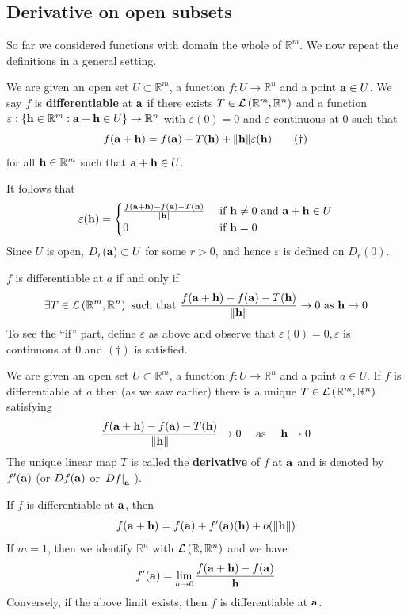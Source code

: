 \documentclass[a4paper]{article}
\begin{document}
\subsection{Derivative on open subsets}
So far we considered functions with domain the whole of $\mathbb{R}^{m}$. We now repeat the definitions in a general setting.

\begin{definition}
    We are given an open set $U \subset \mathbb{R}^{m}$, a function $f: U \rightarrow \mathbb{R}^{n}$ and a point ${\bf a} \in U$. We say $f$ is \textbf{differentiable} at ${\bf a}$ if there exists $T \in {\mathcal{L}}\left(\mathbb{R}^{m}, \mathbb{R}^{n}\right)$ and a function $\varepsilon:\left\{{\bf h} \in \mathbb{R}^{m}: {\bf a}+{\bf h} \in U\right\} \rightarrow \mathbb{R}^{n}$ with $\varepsilon(0)=0$ and $\varepsilon$ continuous at 0 such that
\[
f({\bf a}+{\bf h})=f({\bf a})+T({\bf h})+\|{\bf h}\| \varepsilon({\bf h}) \tag{$\dagger$}
\]
for all ${\bf h} \in \mathbb{R}^{m}$ such that ${\bf a}+{\bf h} \in U$.
\end{definition}
It follows that
$$
\varepsilon({\bf h})= \begin{cases}\frac{f({\bf a}+{\bf h})-f({\bf a})-T({\bf h})}{\|{\bf h}\|} & \text { if } {\bf h} \neq 0 \text { and } {\bf a}+{\bf h} \in U \\ 0 & \text { if } {\bf h}=0\end{cases}
$$
Since $U$ is open, $D_{r}({\bf a}) \subset U$ for some $r>0$, and hence $\varepsilon$ is defined on $D_{r}(0)$.
\begin{note}
    $f$ is differentiable at $a$ if and only if
$$
\exists T \in {\mathcal{L}}\left(\mathbb{R}^{m}, \mathbb{R}^{n}\right) \text { such that } \frac{f({\bf a}+{\bf h})-f({\bf a})-T({\bf h})}{\|{\bf h}\|} \rightarrow 0 \text { as } {\bf h} \rightarrow 0
$$
To see the ``if'' part, define $\varepsilon$ as above and observe that $\varepsilon(0)=0, \varepsilon$ is continuous at 0 and $(\dagger)$ is satisfied.
\end{note}

\begin{definition}
    We are given an open set $U \subset \mathbb{R}^{m}$, a function $f: U \rightarrow \mathbb{R}^{n}$ and a point $a \in U$. If $f$ is differentiable at $a$ then (as we saw earlier) there is a unique $T \in {\mathcal{L}}\left(\mathbb{R}^{m}, \mathbb{R}^{n}\right)$ satisfying
$$
\frac{f({\bf a}+{\bf h})-f({\bf a})-T({\bf h})}{\|{\bf h}\|} \rightarrow 0 \quad \text { as } \quad {\bf h} \rightarrow 0
$$
The unique linear map $T$ is called the \textbf{derivative} of $f$ at ${\bf a}$ and is denoted by $f^{\prime}({\bf a})$ (or $D f({\bf a})$ or $\left.D f\right|_{{\bf a}}$ ).
\end{definition}
\begin{note}
    If $f$ is differentiable at ${\bf a}$, then
$$
f({\bf a}+{\bf h})=f({\bf a})+f^{\prime}({\bf a})({\bf h})+o(\|{\bf h}\|)
$$
If $m=1$, then we identify $\mathbb{R}^{n}$ with ${\mathcal{L}}\left(\mathbb{R}, \mathbb{R}^{n}\right)$ and we have
$$
f^{\prime}({\bf a})=\lim _{h \rightarrow 0} \frac{f({\bf a}+{\bf h})-f({\bf a})}{{\bf h}}
$$
Conversely, if the above limit exists, then $f$ is differentiable at ${\bf a}$.
\end{note}
\end{document}
